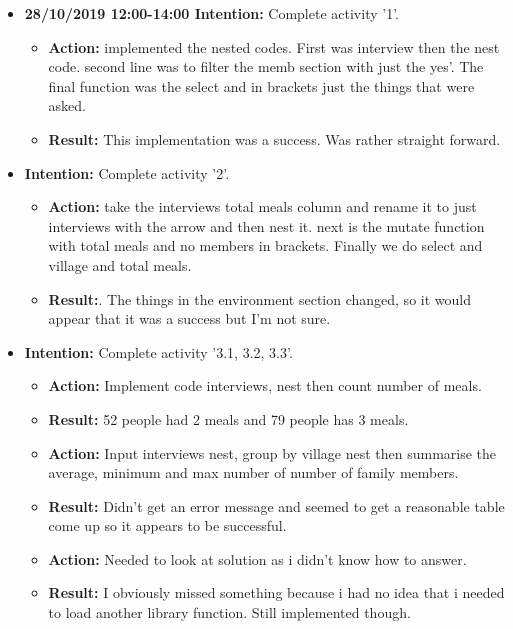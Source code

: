\documentclass{article}
\begin{document}
\begin{itemize}

\item{\textbf{28/10/2019 12:00-14:00 Intention:} Complete activity '1'.}

\begin{itemize}
\item{\textbf{Action:} implemented the nested codes. First was interview then the nest code. second line was to filter the memb section with just the yes'. The final function was the select and in brackets just the things that were asked.}
\item{\textbf{Result:} This implementation was a success. Was rather straight forward.}
\end{itemize}

\item{\textbf{Intention:} Complete activity '2'.}

\begin{itemize}
\item{\textbf{Action:} take the interviews total meals column and rename it to just interviews with the arrow and then nest it. next is the mutate function with total meals and no members in brackets. Finally we do select and village and total meals.}
\item{\textbf{Result:}. The things in the environment section changed, so it would appear that it was a success but I'm not sure.}
\end{itemize}

\item{\textbf{Intention:} Complete activity '3.1, 3.2, 3.3'.}

\begin{itemize}
\item{\textbf{Action:} Implement code interviews, nest then count number of meals.}
\item{\textbf{Result:} 52 people had 2 meals and 79 people has 3 meals.}

\item{\textbf{Action:} Input interviews nest, group by village nest then summarise the average, minimum and max number of number of family members.}
\item{\textbf{Result:} Didn't get an error message and seemed to get a reasonable table come up so it appears to be successful.}

\item{\textbf{Action:} Needed to look at solution as i didn't know how to answer.}
\item{\textbf{Result:} I obviously missed something because i had no idea that i needed to load another library function. Still implemented though.}



\end{itemize}
\end{itemize}
\end{document}
